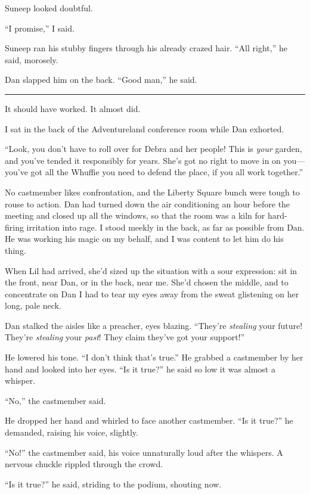 Suneep looked doubtful.

“I promise,” I said.

Suneep ran his stubby fingers through his already crazed hair. “All
right,” he said, morosely.

Dan slapped him on the back. “Good man,” he said.

\begin{center}\rule{3in}{0.4pt}\end{center}

It should have worked. It almost did.

I sat in the back of the Adventureland conference room while Dan
exhorted.

“Look, you don't have to roll over for Debra and her people! This
is \emph{your} garden, and you've tended it responsibly for years.
She's got no right to move in on you—you've got all the Whuffie you
need to defend the place, if you all work together.”

No castmember likes confrontation, and the Liberty Square bunch
were tough to rouse to action. Dan had turned down the air
conditioning an hour before the meeting and closed up all the
windows, so that the room was a kiln for hard-firing irritation
into rage. I stood meekly in the back, as far as possible from Dan.
He was working his magic on my behalf, and I was content to let him
do his thing.

When Lil had arrived, she'd sized up the situation with a sour
expression: sit in the front, near Dan, or in the back, near me.
She'd chosen the middle, and to concentrate on Dan I had to tear my
eyes away from the sweat glistening on her long, pale neck.

Dan stalked the aisles like a preacher, eyes blazing. “They're
\emph{stealing} your future! They're \emph{stealing} your
\emph{past}! They claim they've got your support!”

He lowered his tone. “I don't think that's true.” He grabbed a
castmember by her hand and looked into her eyes. “Is it true?” he
said so low it was almost a whisper.

“No,” the castmember said.

He dropped her hand and whirled to face another castmember. “Is it
true?” he demanded, raising his voice, slightly.

“No!” the castmember said, his voice unnaturally loud after the
whispers. A nervous chuckle rippled through the crowd.

“Is it true?” he said, striding to the podium, shouting now.

